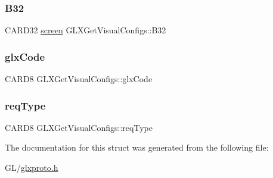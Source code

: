 \subsubsection{\texorpdfstring{B32}{B32}}
{\footnotesize\ttfamily C\+A\+R\+D32 \hyperlink{cad_8h_ae04e09e4e3831bfc1632c509ae37dcec}{screen} G\+L\+X\+Get\+Visual\+Configs\+::\+B32}

\mbox{\label{struct_g_l_x_get_visual_configs_a30903296ad447c4823f1e0327fb29a2a}} 
\subsubsection{\texorpdfstring{glx\+Code}{glxCode}}
{\footnotesize\ttfamily C\+A\+R\+D8 G\+L\+X\+Get\+Visual\+Configs\+::glx\+Code}

\mbox{\label{struct_g_l_x_get_visual_configs_aef8634a003b75c3fb4144db10b836f49}} 
\subsubsection{\texorpdfstring{req\+Type}{reqType}}
{\footnotesize\ttfamily C\+A\+R\+D8 G\+L\+X\+Get\+Visual\+Configs\+::req\+Type}



The documentation for this struct was generated from the following file\+:\begin{DoxyCompactItemize}
\item 
G\+L/\hyperlink{glxproto_8h}{glxproto.\+h}\end{DoxyCompactItemize}
